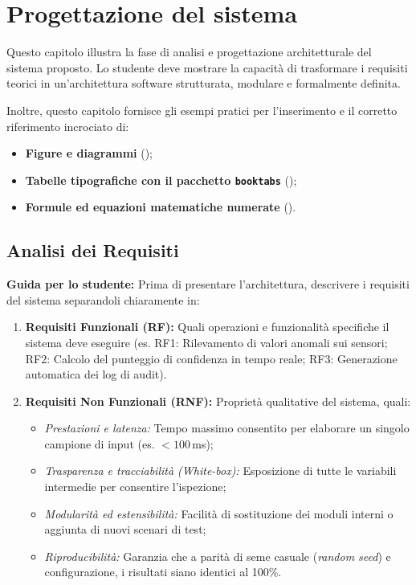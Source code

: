 \chapter{Progettazione del sistema}
\label{cap:sistema}

Questo capitolo illustra la fase di analisi e progettazione architetturale del sistema proposto. Lo studente deve mostrare la capacità di trasformare i requisiti teorici in un'architettura software strutturata, modulare e formalmente definita.

Inoltre, questo capitolo fornisce gli esempi pratici per l'inserimento e il corretto riferimento incrociato di:
\begin{itemize}
    \item \textbf{Figure e diagrammi} ();
    \item \textbf{Tabelle tipografiche con il pacchetto \texttt{booktabs}} ();
    \item \textbf{Formule ed equazioni matematiche numerate} ().
\end{itemize}


\section{Analisi dei Requisiti}
\label{sec:requisiti}

\textbf{Guida per lo studente:} Prima di presentare l'architettura, descrivere i requisiti del sistema separandoli chiaramente in:
\begin{enumerate}
    \item \textbf{Requisiti Funzionali (RF):} Quali operazioni e funzionalità specifiche il sistema deve eseguire (es. RF1: Rilevamento di valori anomali sui sensori; RF2: Calcolo del punteggio di confidenza in tempo reale; RF3: Generazione automatica dei log di audit).
    \item \textbf{Requisiti Non Funzionali (RNF):} Proprietà qualitative del sistema, quali:
    \begin{itemize}
        \item \emph{Prestazioni e latenza:} Tempo massimo consentito per elaborare un singolo campione di input (es. $< 100$\,ms);
        \item \emph{Trasparenza e tracciabilità (White-box):} Esposizione di tutte le variabili intermedie per consentire l'ispezione;
        \item \emph{Modularità ed estensibilità:} Facilità di sostituzione dei moduli interni o aggiunta di nuovi scenari di test;
        \item \emph{Riproducibilità:} Garanzia che a parità di seme casuale (\emph{random seed}) e configurazione, i risultati siano identici al 100\%.
    \end{itemize}
\end{enumerate}


